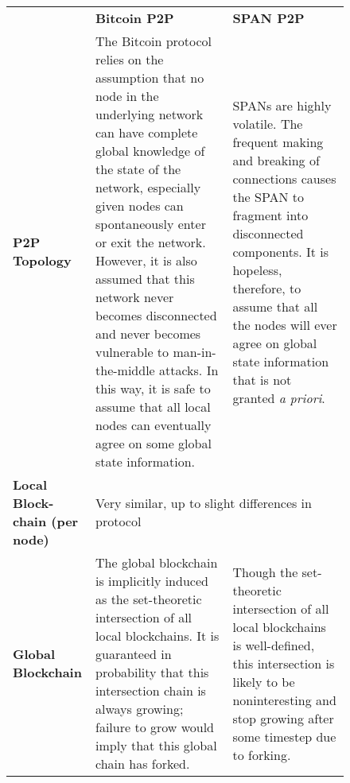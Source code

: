 \begin{figure*}[t]
	\centering
	\begin{tabular}{|p{3cm}||p{6.7cm}|p{6.7cm}|}
		\hline
		& \textbf{Bitcoin P2P} & \textbf{SPAN P2P} \\
		\hhline{|-||-|-|}

		\textbf{P2P Topology} &
			The Bitcoin protocol relies on the assumption that
			no node in the underlying network can have
			complete global knowledge of the state of the
			network, especially given nodes can spontaneously enter or
			exit the network. However, it is also assumed that
			this network never becomes disconnected and never
			becomes vulnerable to man-in-the-middle attacks.
			In this way, it is safe to assume that all local
			nodes can eventually agree on some global state
			information.
			&
			SPANs are highly volatile. The frequent making and
			breaking of connections causes the SPAN
			to fragment into disconnected components. It is hopeless,
			therefore, to assume that all the nodes will ever
			agree on global state information that is not
			granted \textit{a priori}.
			\\
		\hline

		\raggedright
		\textbf{Local Block-\\chain (per node)} & %
			\multicolumn{2}{|l|}{
				Very similar, up to slight differences in protocol
			}
			\\
		\hline

		\textbf{Global Blockchain} &
			The global blockchain is implicitly induced as the
			set-theoretic intersection of all local blockchains.
			It is guaranteed in probability that this intersection
			chain is always growing; failure to grow would imply
			that this global chain has forked.
			&
			Though the set-theoretic intersection of all local
			blockchains is well-defined, this intersection is
			likely to be noninteresting and stop growing after some
			timestep due to forking.
			\\
		\hline


\end{tabular}
\end{figure*}
